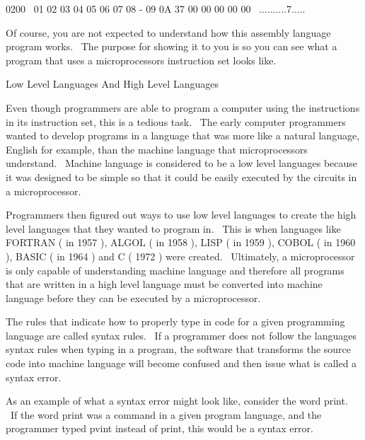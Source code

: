 \documentclass[12pt,twoside]{book}
\begin{document}
\bigskip

0200 \ 01 02 03 04 05 06 07 08 {}- 09 0A 37 00 00 00 00 00
\ ..........7.....


\bigskip

Of course, you are not expected to understand how this assembly language program works. \ The purpose for showing it to you is so you can see what a program that uses a microprocessor{\textquotesingle}s instruction set looks like. 

\bigskip

Low Level Languages And High Level Languages

Even though programmers are able to program a computer using the instructions in its instruction set, this is a tedious task. \ The early computer programmers wanted to develop programs in a language that was more like a natural language, English for example, than the machine language that microprocessors understand. \ Machine language is considered to be a low level languages because it was designed to be simple so that it could be easily executed by the circuits in a microprocessor. 

\bigskip

Programmers then figured out ways to use low level languages to create the high level languages that they wanted to program in. \ This is when languages like FORTRAN ( in 1957 ), ALGOL ( in 1958 ), LISP ( in 1959 ), COBOL ( in 1960 ), BASIC ( in 1964 ) and C ( 1972 ) were created. \ Ultimately, a microprocessor is only capable of understanding machine language and therefore all programs that are written in a high level language must be converted into machine language before they can be executed by a microprocessor. 

\bigskip

The rules that indicate how to properly type in code for a given programming language are called syntax rules. \ If a programmer does not follow the language{\textquotesingle}s syntax rules when typing in a program, the software that transforms the source code into machine language will become confused and then issue what is called a syntax error. 

\bigskip

As an example of what a syntax error might look like, consider the word {\textquotesingle}print{\textquotesingle}. \ If the word {\textquotesingle}print{\textquotesingle} was a command in a given program language, and the programmer typed {\textquotesingle}pvint{\textquotesingle} instead of {\textquotesingle}print{\textquotesingle}, this would be a syntax error.
\end{document}
